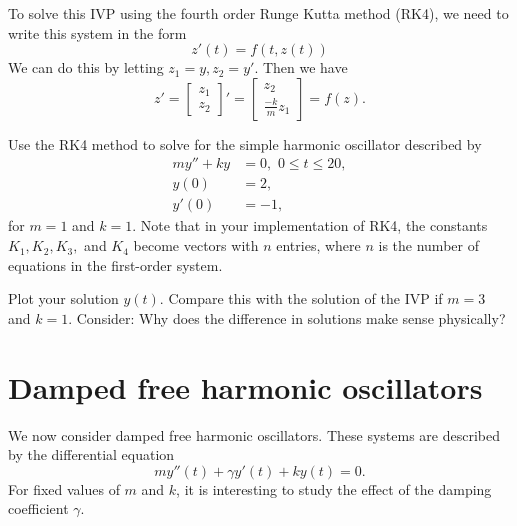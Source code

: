 To solve this IVP using the fourth order Runge Kutta method (RK4), we need to write this system in the form 
\[z'(t) = f(t,z(t)) \]
We can do this by letting $z_1 = y, z_2 = y'$. Then we have \[     z'= 
 \left[\begin{array}{c}z_1 \\z_2\end{array}\right]'  =  \left[\begin{array}{c}z_2 \\\frac{-k}{m}z_1\end{array}\right]= f(z).\]


\begin{problem} Use the RK4 method to solve for the simple harmonic oscillator 
described by 
\begin{align*}
my'' + ky &= 0,\,\, 0 \leq t \leq 20, \\
y(0) &= 2, \\
y'(0) &= -1,
\end{align*} 
for $m = 1$ and $k =1$. Note that in your implementation of RK4, the constants $K_1, K_2, K_3,$ and $K_4$ become vectors with $n$ entries, where $n$ is the number of equations in the first-order system. 

Plot your solution $y(t)$.  Compare this with the solution of the IVP if  $m = 3$ and $k =1$. Consider: Why does the difference in solutions make sense physically?
\end{problem}


\section*{Damped free harmonic oscillators} We now consider damped free harmonic oscillators. These systems are described by the differential equation
\[my''(t) +\gamma y'(t) + ky(t) = 0.\]
For fixed values of $m$ and $k$, it is interesting to study the effect of the damping coefficient $\gamma$. 


